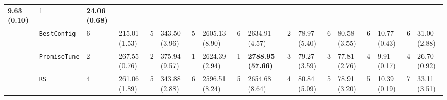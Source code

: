 \begin{tabular}{clllllllllllllllll}
  \multicolumn{1}{l|}{\cellcolor{blue!15}\textbf{9.63 (0.10)}} &
  \cellcolor{blue!15}1 &
  \cellcolor{blue!15}\textbf{24.06 (0.68)} \\
\multicolumn{1}{c|}{} &
  \multicolumn{1}{l|}{\texttt{BestConfig}} &
  6 &
  \multicolumn{1}{l|}{215.01 (1.53)} &
  5 &
  \multicolumn{1}{l|}{343.50 (3.96)} &
  5 &
  \multicolumn{1}{l|}{2605.13 (8.90)} &
  6 &
  \multicolumn{1}{l|}{2634.91 (4.57)} &
  2 &
  \multicolumn{1}{l|}{78.97 (5.40)} &
  6 &
  \multicolumn{1}{l|}{80.58 (3.55)} &
  6 &
  \multicolumn{1}{l|}{10.77 (0.43)} &
  6 &
  31.00 (2.88) \\
\multicolumn{1}{c|}{} &
  \multicolumn{1}{l|}{\texttt{PromiseTune}} &
  2 &
  \multicolumn{1}{l|}{267.55 (0.76)} &
  2 &
  \multicolumn{1}{l|}{375.94 (9.57)} &
  \cellcolor{blue!15}1 &
  \multicolumn{1}{l|}{\cellcolor{blue!15}2624.39 (2.94)} &
  \cellcolor{blue!15}1 &
  \multicolumn{1}{l|}{\cellcolor{blue!15}\textbf{2788.95 (57.66)}} &
  3 &
  \multicolumn{1}{l|}{79.27 (3.59)} &
  3 &
  \multicolumn{1}{l|}{77.81 (2.76)} &
  4 &
  \multicolumn{1}{l|}{9.91 (0.17)} &
  4 &
  26.70 (0.92) \\
\multicolumn{1}{c|}{} &
  \multicolumn{1}{l|}{\texttt{RS}} &
  4 &
  \multicolumn{1}{l|}{261.06 (1.89)} &
  5 &
  \multicolumn{1}{l|}{343.88 (2.88)} &
  6 &
  \multicolumn{1}{l|}{2596.51 (8.24)} &
  5 &
  \multicolumn{1}{l|}{2654.68 (8.64)} &
  4 &
  \multicolumn{1}{l|}{80.84 (5.09)} &
  5 &
  \multicolumn{1}{l|}{78.91 (3.20)} &
  5 &
  \multicolumn{1}{l|}{10.39 (0.19)} &
  7 &
  33.11 (3.51) \\
\hline
\end{tabular}